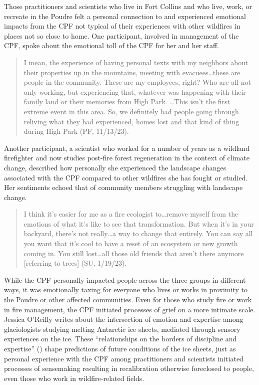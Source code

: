 \documentclass[
]{article}
\begin{document}
Those practitioners and scientists who live in Fort Collins and who live, work, or recreate in the Poudre felt a personal connection to and experienced emotional impacts from the CPF not typical of their experiences with other wildfires in places not so close to home. One participant, involved in management of the CPF, spoke about the emotional toll of the CPF for her and her staff.

\begin{quote}
I mean, the experience of having personal texts with my neighbors about their properties up in the mountains, meeting with evacuees\ldots these are people in the community. These are my employees, right? Who are all not only working, but experiencing that, whatever was happening with their family land or their memories from High Park. \ldots This isn't the first extreme event in this area. So, we definitely had people going through reliving what they had experienced, homes lost and that kind of thing during High Park (PF, 11/13/23).
\end{quote}

Another participant, a scientist who worked for a number of years as a wildland firefighter and now studies post-fire forest regeneration in the context of climate change, described how personally she experienced the landscape changes associated with the CPF compared to other wildfires she has fought or studied. Her sentiments echoed that of community members struggling with landscape change.

\begin{quote}
I think it's easier for me as a fire ecologist to\ldots remove myself from the emotions of what it's like to see that transformation. But when it's in your backyard, there's not really\ldots a way to change that entirely. You can say all you want that it's cool to have a reset of an ecosystem or new growth coming in. You still lost\ldots all those old friends that aren't there anymore {[}referring to trees{]} (SU, 1/19/23).
\end{quote}

While the CPF personally impacted people across the three groups in different ways, it was emotionally taxing for everyone who lives or works in proximity to the Poudre or other affected communities. Even for those who study fire or work in fire management, the CPF initiated processes of grief on a more intimate scale. Jessica O'Reilly writes about the intersection of emotion and expertise among glaciologists studying melting Antarctic ice sheets, mediated through sensory experiences on the ice. These ``relationships on the borders of discipline and expertise'' () shape predictions of future conditions of the ice sheets, just as personal experience with the CPF among practitioners and scientists initiated processes of sensemaking resulting in recalibration otherwise foreclosed to people, even those who work in wildfire-related fields.
\end{document}
